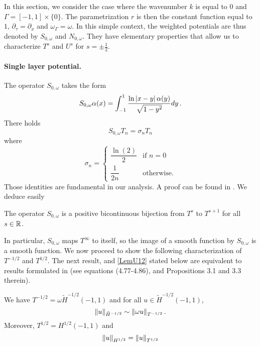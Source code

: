 \documentclass[a4paper]{article}
\begin{document}
In this section, we consider the case where the wavenumber $k$ is equal to $0$ and $\Gamma = [-1,1]\times{\{0\}}$. The parametrization $r$ is then the constant function equal to $1$, $\partial_\tau = \partial_x$ and $\omega_\Gamma = \omega$. In this simple context, the weighted potentials are thus denoted by $S_{0,\omega}$ and $N_{0,\omega}$. They have elementary properties that allow us to characterize $T^{s}$ and $U^s$ for $s = \pm \frac{1}{2}$. 

\paragraph{Single layer potential.} The operator $S_{0,\omega}$ takes the form 
\[S_{0,\omega} \alpha(x) = \int_{-1}^{1} \frac{\ln \left\lvert x - y \right\rvert \alpha(y)}{\sqrt{1 - y^2}}dy \,.\]
There holds 
\begin{equation}
\label{explicitEigs}
S_{0,\omega} T_n = \sigma_n T_n
\end{equation}
where 
\[\sigma_n = \begin{cases}
\dfrac{\ln(2)}{2} & \text{if } n=0\\
\dfrac{1}{2n} & \text{otherwise}.
\end{cases}\]
Those identities are fundamental in our analysis. A proof can be found in \cite[Theorem 9.2]{mason2002chebyshev}. We deduce easily
\begin{Lem}
	The operator $S_{0,\omega}$ is a positive bicontinuous bijection from $T^s$ to $T^{s+1}$ for all $s \in \mathbb{R}$. 
	\label{SomegaMapProp}
\end{Lem}
In particular, $S_{0,\omega}$ maps $T^{\infty}$ to itself, so the image of a smooth function by $S_{0,\omega}$ is a smooth function. We now proceed to show the following characterization of $T^{-1/2}$ and $T^{1/2}$. The next result, and \autoref{LemU12} stated below are equivalent to results formulated in \cite{jerez2012explicit} (see equations (4.77-4.86), and Propositions 3.1 and 3.3 therein).
\begin{Lem}
	\label{LemmaT-1/2}
	We have $T^{-1/2} = \omega\tilde{H}^{-1/2}(-1,1)$ and for all $u \in \tilde{H}^{-1/2}(-1,1)$,
	\[\left\|u\right\|_{\tilde{H}^{-1/2}} \sim \left\|\omega u\right\|_{T^{-1/2}}.\] 
	Moreover, $T^{1/2} = H^{1/2}(-1,1)$ and 
	\[\left\|u\right\|_{H^{1/2}} = \left\|u\right\|_{T^{1/2}}\]
\end{Lem}
\end{document}

